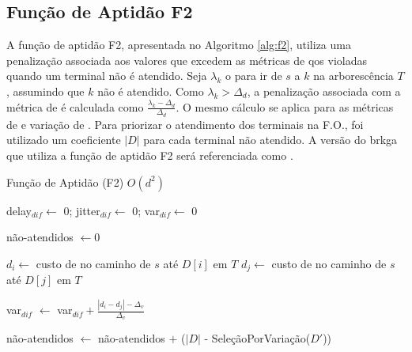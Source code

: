 \subsection{Função de Aptidão F2} \label{subsec:brkga-f2}

A  função de  aptidão F2,  apresentada  no Algoritmo  \ref{alg:f2}, utiliza  uma
penalização associada aos valores que  excedem as métricas de \gls{qos} violadas
quando um terminal não é atendido. Seja  $\lambda_k$ o {\delay} para ir de $s$ a
$k$ na  arborescência $T$, assumindo que  $k$ não é atendido.  Como $\lambda_k >
\Delta_d$, a  penalização associada com a  métrica de {\delay} é  calculada como
$\frac{\lambda_k  - \Delta_d}{\Delta_d}$.  O  mesmo cálculo  se  aplica para  as
métricas de {\jitter}  e variação de {\delay}. Para priorizar  o atendimento dos
terminais na  F.O., foi utilizado  um coeficiente  $|D|$ para cada  terminal não
atendido.  A versão  do \gls{brkga}  que  utiliza a  função de  aptidão F2  será
referenciada como {\bfdois}.

\begin{algorithm}[!ht]
  \caption{Função de Aptidão (F2) $O(d^2)$ \label{alg:f2}}
  
  delay$_{dif} \leftarrow$ 0;
  jitter$_{dif} \leftarrow$ 0;
  var$_{dif} \leftarrow$ 0\;
  
  não-atendidos $\leftarrow 0$\;

   \label{line:for-l-j-end}

   { \label{line:for-var-begin}
     {
      $d_{i} \leftarrow$ custo de {\delay} no caminho de $s$ até $D[i]$ em $T$\;
      $d_{j} \leftarrow$ custo de {\delay} no caminho de $s$ até $D[j]$ em $T$\;
    
       { \label{line:notation-abuse}
        var$_{dif}$ $\leftarrow$ var$_{dif} + \frac{|d_i - d_j| - \Delta_v}{\Delta_v}$\;
      }
    }
  } \label{line:for-var-end}
 
  não-atendidos $\leftarrow$ não-atendidos $+$ ($|D|$ - SeleçãoPorVariação($D'$))\;

  \; \label{line:return-val}
\end{algorithm}

